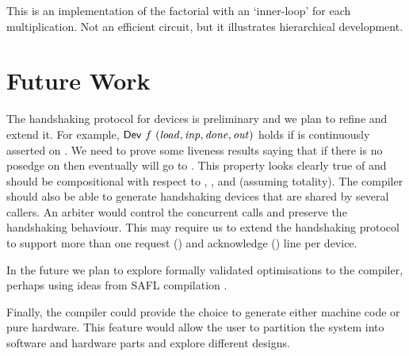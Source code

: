 \documentclass{llncs}
\begin{document}
This is an implementation of the factorial with an `inner-loop' for each multiplication.
Not an efficient circuit, but it illustrates hierarchical development.

\vspace*{-1mm}

\section{Future Work}
\label{secConclusionAndFutureWork}

\vspace*{-1mm}


The handshaking protocol for devices is
preliminary and we plan to refine and extend it.  For example,
$\DEF{Dev}\ f\ \VAR{(load,inp,done,out)}$ holds if
 is continuously asserted on . We need to prove some
liveness results saying that if there is no posedge on  then
eventually  will go to . This property looks clearly
true of  and should be compositional with respect to
, ,  and  (assuming totality). 
The compiler should also be able to generate handshaking devices
that are shared by several callers. An arbiter would control
the concurrent calls and preserve the handshaking behaviour. This may
require us to extend the handshaking protocol to support more than one
request () and acknowledge () line per device.


In the future we plan to 
explore formally validated optimisations to the compiler,
perhaps using ideas from SAFL compilation \cite{Sha02}.

Finally, the compiler could provide the choice to
generate either machine code or pure hardware. 
This feature would allow the user to
partition the system into software and hardware
parts and explore different designs.

\vspace*{-1mm}
\end{document}
